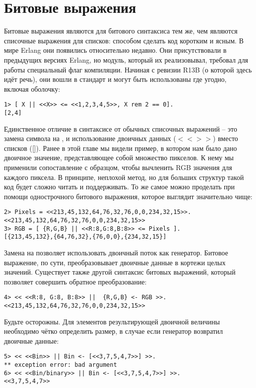 \section{Битовые выражения}
\label{binary-comprehensions}
Битовые выражения являются для битового синтаксиса тем же, чем являются списочные выражения для списков: способом сделать код коротким и ясным.
В мире Erlang они появились относительно недавно.
Они присутствовали в предыдущих версиях Erlang, но модуль, который их реализовывал, требовал для работы специальный флаг компиляции.
Начиная с ревизии R13B (о которой здесь идёт речь), они вошли в стандарт и могут быть использованы где угодно, включая оболочку:
\begin{lstlisting}[style=repl]
1> [ X || <<X>> <= <<1,2,3,4,5>>, X rem 2 == 0].    
[2,4]
\end{lstlisting}

Единственное отличие в синтаксисе от обычных списочных выражений \--- это замена символа \ops{$<-$} на \ops{$<=$}, и использование двоичных данных ($<< >>$) вместо списков ([]).
Ранее в этой главе мы видели пример, в котором нам было дано двоичное значение, представляющее собой множество пикселов.
К нему мы применили сопоставление с образцом, чтобы вычленить RGB значения для каждого пиксела.
В принципе, неплохой метод, но для больших структур такой код будет сложно читать и поддерживать.
То же самое можно проделать при помощи однострочного битового выражения, которое выглядит значительно чище:
\begin{lstlisting}[style=repl]
2> Pixels = <<213,45,132,64,76,32,76,0,0,234,32,15>>.
<<213,45,132,64,76,32,76,0,0,234,32,15>>
3> RGB = [ {R,G,B} || <<R:8,G:8,B:8>> <= Pixels ].
[{213,45,132},{64,76,32},{76,0,0},{234,32,15}]
\end{lstlisting}

Замена \ops{$<-$} на \ops{$<=$} позволяет использовать двоичный поток как генератор.
Битовое выражение, по сути, преобразовывает двоичные данные в кортежи целых значений.
Существует также другой синтаксис битовых выражений, который позволяет совершить обратное преобразование:
\begin{lstlisting}[style=repl]
4> << <<R:8, G:8, B:8>> ||  {R,G,B} <- RGB >>.
<<213,45,132,64,76,32,76,0,0,234,32,15>>
\end{lstlisting}

Будьте осторожны.
Для элементов результирующей двоичной величины необходимо чётко определить размер, в случае если генератор возвратил двоичные данные:
\begin{lstlisting}[style=repl]
5> << <<Bin>> || Bin <- [<<3,7,5,4,7>>] >>.
** exception error: bad argument
6> << <<Bin/binary>> || Bin <- [<<3,7,5,4,7>>] >>. 
<<3,7,5,4,7>>
\end{lstlisting}


